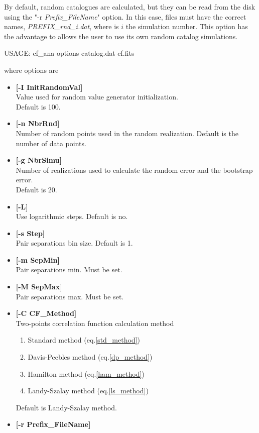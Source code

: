 By default, random catalogues are calculated, but they can be read
from the disk using the "-r {\em Prefix\_FileName}" option.  In this
case, files must have the correct names, {\em PREFIX\_rnd\_i.dat},
where is $i$ the simulation number.  This option has the advantage to
allows the user to use its own random catalog simulations.

\begin{center}
  USAGE: cf\_ana options catalog.dat cf.fits
\end{center}
where options are 
\begin{itemize}
\item {\bf [-I InitRandomVal]} \\
  Value used for random value generator initialization. \\
  Default is 100.
\item {\bf [-n NbrRnd]} \\
  Number of random points used in the random realization.  Default is
  the number of data points.
\item {\bf [-g NbrSimu]} \\
  Number of realizations used to calculate the random error
  and the bootstrap error. \\
  Default is 20.
\item {\bf [-L]} \\
  Use logarithmic steps. Default is no.
\item {\bf [-s Step]} \\
  Pair separations bin size. Default is 1.
\item {\bf [-m SepMin]}  \\
  Pair separations min. Must be set.
\item {\bf [-M SepMax]}  \\
  Pair separations max. Must be set.
\item {\bf [-C CF\_Method]} \\
  Two-points correlation function calculation method
\begin{enumerate}
\item Standard method (eq.\ref{std_method})
\item Davis-Peebles method (eq.\ref{dp_method})
\item Hamilton method (eq.\ref{ham_method}) 
\item Landy-Szalay method (eq.\ref{ls_method})  
\end{enumerate}             
Default is Landy-Szalay method.
\item {\bf  [-r Prefix\_FileName]} \\

\end{itemize}
